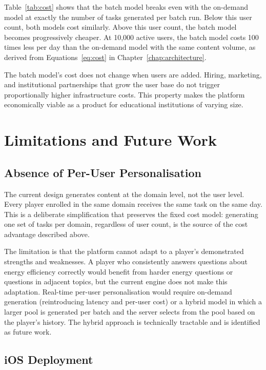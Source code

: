 Table~\ref{tab:cost} shows that the batch model breaks even with the on-demand model at exactly the number of tasks generated per batch run. Below this user count, both models cost similarly. Above this user count, the batch model becomes progressively cheaper. At 10,000 active users, the batch model costs 100 times less per day than the on-demand model with the same content volume, as derived from Equations~\ref{eq:cost} in Chapter~\ref{chap:architecture}.

The batch model's cost does not change when users are added. Hiring, marketing, and institutional partnerships that grow the user base do not trigger proportionally higher infrastructure costs. This property makes the platform economically viable as a product for educational institutions of varying size.


\section{Limitations and Future Work}

\subsection{Absence of Per-User Personalisation}

The current design generates content at the domain level, not the user level. Every player enrolled in the same domain receives the same task on the same day. This is a deliberate simplification that preserves the fixed cost model: generating one set of tasks per domain, regardless of user count, is the source of the cost advantage described above.

The limitation is that the platform cannot adapt to a player's demonstrated strengths and weaknesses. A player who consistently answers questions about energy efficiency correctly would benefit from harder energy questions or questions in adjacent topics, but the current engine does not make this adaptation. Real-time per-user personalisation would require on-demand generation (reintroducing latency and per-user cost) or a hybrid model in which a larger pool is generated per batch and the server selects from the pool based on the player's history. The hybrid approach is technically tractable and is identified as future work.

\subsection{iOS Deployment}

